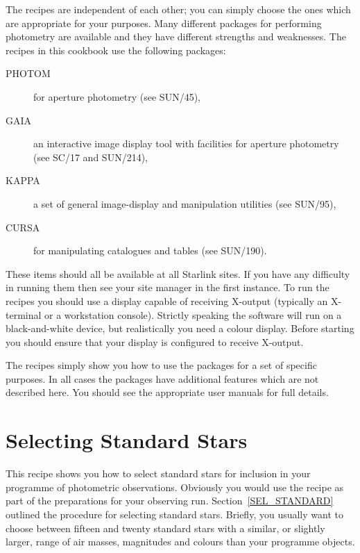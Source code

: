 \documentclass[twoside,11pt]{article}
\newcommand{\xref}[3]{#1}
\newcommand{\xlabel}[1]{}
\begin{document}
The recipes are independent of each other; you can simply choose the
ones which are appropriate for your purposes.  Many different packages
for performing photometry are available and they have different strengths
and weaknesses.  The recipes in this cookbook use the following packages:

\begin{description}

  \item[PHOTOM] for aperture photometry (see
   \xref{SUN/45}{sun45}{}\cite{SUN45}),

  \item[GAIA] an interactive image display tool with facilities for
   aperture photometry (see \xref{SC/17}{sc17}{}\cite{SC17} and
   \xref{SUN/214}{sun214}{}\cite{SUN214}),

  \item[KAPPA] a set of general image-display and manipulation
   utilities (see \xref{SUN/95}{sun95}{}\cite{SUN95}),

  \item[CURSA] for manipulating catalogues and tables (see
   \xref{SUN/190}{sun190}{}\cite{SUN190}).

\end{description}

These items should all be available at all Starlink sites.  If you
have any difficulty in running them then see your site manager in
the first instance.  To run the recipes you should use a display
capable of receiving X-output (typically an X-terminal or a workstation
console).  Strictly speaking the software will run on a black-and-white
device, but realistically you need a colour display.  Before starting
you should ensure that your display is configured to receive X-output.

The recipes simply show you how to use the packages for a set of
specific purposes.  In all cases the packages have additional features
which are not described here.  You should see the appropriate user
manuals for full details.


\newpage
\section{\xlabel{STANDARDS_RECIP}\label{STANDARDS_RECIP}Selecting
Standard Stars}

This recipe shows you how to select standard stars for inclusion in your
programme of photometric observations.  Obviously you would use the
recipe as part of the preparations for your observing run.
Section~\ref{SEL_STANDARD} outlined the procedure for selecting standard
stars.  Briefly, you usually want to choose between fifteen and twenty
standard stars with a similar, or slightly larger, range of air masses,
magnitudes and colours than your programme objects.
\end{document}

